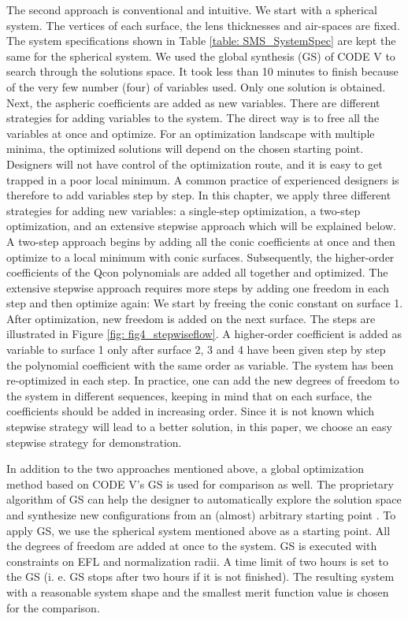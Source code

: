 The second approach is conventional and intuitive. We start with a spherical system. The vertices of each surface, the lens thicknesses and air-spaces are fixed. The system specifications shown in Table \ref{table: SMS_SystemSpec} are kept the same for the spherical system. We used the global synthesis (GS) of CODE V to search through the solutions space. It took less than 10 minutes to finish because of the very few number (four) of variables used. Only one solution is obtained. Next, the aspheric coefficients are added as new variables. There are different strategies for adding variables to the system. The direct way is to free all the variables at once and optimize. For an optimization landscape with multiple minima, the optimized solutions will depend on the chosen starting point. Designers will not have control of the optimization route, and it is easy to get trapped in a poor local minimum. A common practice of experienced designers is therefore to add variables step by step. In this chapter, we apply three different strategies for adding new variables: a single-step optimization, a two-step optimization, and an extensive stepwise approach which will be explained below. A two-step approach begins by adding all the conic coefficients at once and then optimize to a local minimum with conic surfaces. Subsequently, the higher-order coefficients of the Qcon polynomials are added all together and optimized. The extensive stepwise approach requires more steps by adding one freedom in each step and then optimize again: We start by freeing the conic constant on surface 1. After optimization, new freedom is added on the next surface. The steps are illustrated in Figure \ref{fig: fig4_stepwiseflow}. A higher-order coefficient is added as variable to surface 1 only after surface 2, 3 and 4 have been given step by step the polynomial coefficient with the same order as variable. The system has been re-optimized in each step. In practice, one can add the new degrees of freedom to the system in different sequences, keeping in mind that on each surface, the coefficients should be added in increasing order. Since it is not known which stepwise strategy will lead to a better solution, in this paper, we choose an easy stepwise strategy for demonstration.  

In addition to the two approaches mentioned above, a global optimization method based on CODE V’s GS is used for comparison as well. The proprietary algorithm of GS can help the designer to automatically explore the solution space and synthesize new configurations from an (almost) arbitrary starting point \cite{codevmanual}. To apply GS, we use the spherical system mentioned above as a starting point. All the degrees of freedom are added at once to the system. GS is executed with constraints on EFL and normalization radii. A time limit of two hours is set to the GS (i. e. GS stops after two hours if it is not finished). The resulting system with a reasonable system shape and the smallest merit function value is chosen for the comparison. 

